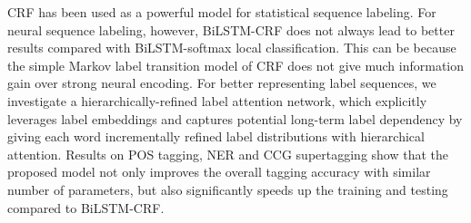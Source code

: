CRF has been used as a powerful model for statistical sequence labeling. For neural sequence labeling, however, BiLSTM-CRF does not always lead to better results compared with BiLSTM-softmax local classification. This can be because the simple Markov label transition model of CRF does not give much information gain over strong neural encoding.
For better representing label sequences, we investigate a hierarchically-refined label attention network, which explicitly leverages label embeddings and captures potential long-term label dependency by giving each word incrementally refined label distributions with hierarchical attention. Results on POS tagging, NER and CCG supertagging show that the proposed model not only improves the overall tagging accuracy with similar number of parameters, but also significantly speeds up the training and testing compared to BiLSTM-CRF.